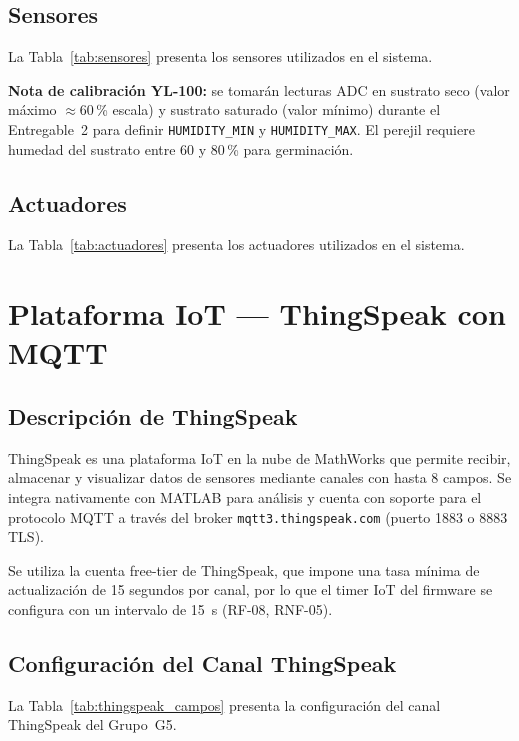 \subsection{Sensores}

La Tabla~\ref{tab:sensores} presenta los sensores utilizados en el sistema.



\noindent\textbf{Nota de calibración YL-100:} se tomarán lecturas ADC en sustrato seco (valor máximo $\approx$60\,\% escala) y sustrato saturado (valor mínimo) durante el Entregable~2 para definir \texttt{HUMIDITY\_MIN} y \texttt{HUMIDITY\_MAX}. El perejil requiere humedad del sustrato entre 60 y 80\,\% para germinación.

\subsection{Actuadores}

La Tabla~\ref{tab:actuadores} presenta los actuadores utilizados en el sistema.



\section{Plataforma IoT --- ThingSpeak con MQTT}

\subsection{Descripción de ThingSpeak}

ThingSpeak es una plataforma IoT en la nube de MathWorks que permite recibir, almacenar y visualizar datos de sensores mediante canales con hasta 8 campos. Se integra nativamente con MATLAB para análisis y cuenta con soporte para el protocolo MQTT a través del broker \texttt{mqtt3.thingspeak.com} (puerto 1883 o 8883 TLS).

Se utiliza la cuenta free-tier de ThingSpeak, que impone una tasa mínima de actualización de 15 segundos por canal, por lo que el timer IoT del firmware se configura con un intervalo de 15~s (RF-08, RNF-05).

\subsection{Configuración del Canal ThingSpeak}

La Tabla~\ref{tab:thingspeak_campos} presenta la configuración del canal ThingSpeak del Grupo~G5.

